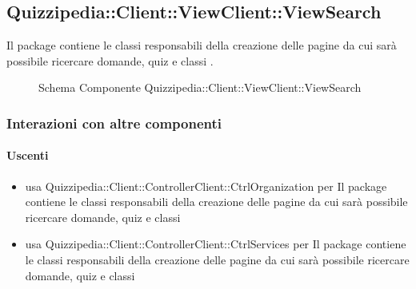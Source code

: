 \subsection{Quizzipedia::Client::ViewClient::ViewSearch}
Il package contiene le classi responsabili della creazione delle pagine da cui sarà possibile ricercare domande, quiz e classi .
\begin{figure}[H]
\centering
\noindent{}
\caption[Schema Componente Quizzipedia::Client::ViewClient::ViewSearch]{Schema Componente Quizzipedia::Client::ViewClient::ViewSearch}
\end{figure}
\subsubsection{Interazioni con altre componenti}
\paragraph{Uscenti}
\begin{itemize}
\item usa Quizzipedia::Client::ControllerClient::CtrlOrganization per Il package contiene le classi responsabili della creazione delle pagine da cui sarà possibile ricercare domande, quiz e classi 
\item usa Quizzipedia::Client::ControllerClient::CtrlServices per Il package contiene le classi responsabili della creazione delle pagine da cui sarà possibile ricercare domande, quiz e classi 
\end{itemize}
